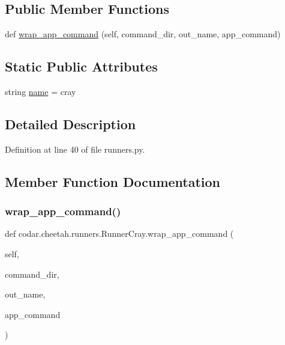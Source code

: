 \subsection*{Public Member Functions}
\begin{DoxyCompactItemize}
\item 
def \hyperlink{classcodar_1_1cheetah_1_1runners_1_1_runner_cray_a48e00e865bfdfffcaf6f3f8030820f70}{wrap\+\_\+app\+\_\+command} (self, command\+\_\+dir, out\+\_\+name, app\+\_\+command)
\end{DoxyCompactItemize}
\subsection*{Static Public Attributes}
\begin{DoxyCompactItemize}
\item 
string \hyperlink{classcodar_1_1cheetah_1_1runners_1_1_runner_cray_af39659e3752a349dcac224089a410a0f}{name} = \textquotesingle{}cray\textquotesingle{}
\end{DoxyCompactItemize}


\subsection{Detailed Description}


Definition at line 40 of file runners.\+py.



\subsection{Member Function Documentation}
\mbox{\label{classcodar_1_1cheetah_1_1runners_1_1_runner_cray_a48e00e865bfdfffcaf6f3f8030820f70}} 
\subsubsection{\texorpdfstring{wrap\+\_\+app\+\_\+command()}{wrap\_app\_command()}}
{\footnotesize\ttfamily def codar.\+cheetah.\+runners.\+Runner\+Cray.\+wrap\+\_\+app\+\_\+command (\begin{DoxyParamCaption}\item[{}]{self,  }\item[{}]{command\+\_\+dir,  }\item[{}]{out\+\_\+name,  }\item[{}]{app\+\_\+command }\end{DoxyParamCaption})}

